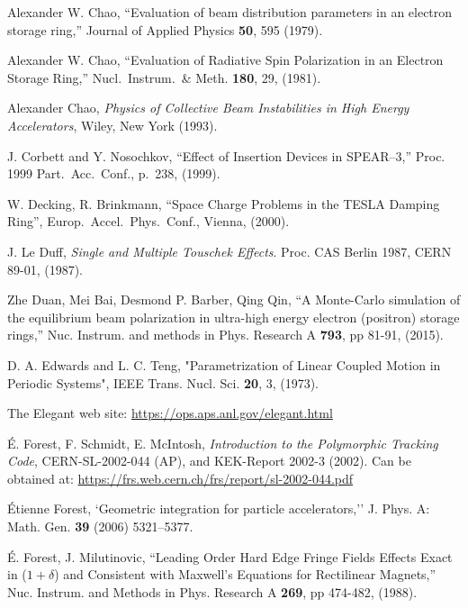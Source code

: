 \begin{thebibliography}{XXXXXXX99}
Alexander W. Chao, 
``Evaluation of beam distribution parameters in an electron storage ring,''
Journal of Applied Physics {\bf 50}, 595 (1979).

Alexander W. Chao, 
``Evaluation of Radiative Spin Polarization in an Electron Storage Ring,''
Nucl.\ Instrum.\ \& Meth. {\bf 180}, 29, (1981).

Alexander Chao, 
{\em Physics of Collective Beam Instabilities in High Energy Accelerators}, 
Wiley, New York (1993). 

J. Corbett and Y. Nosochkov, ``Effect of Insertion Devices in SPEAR--3,''
Proc. 1999 Part.\ Acc.\ Conf., p.~238, (1999).

W. Decking, R. Brinkmann, 
``Space Charge Problems in the TESLA Damping Ring'',
Europ.\ Accel.\ Phys.\ Conf., Vienna, (2000).

  J. Le Duff, \emph{Single and Multiple Touschek Effects}.
  Proc. CAS Berlin 1987,
  CERN 89-01, (1987).

Zhe Duan, Mei Bai, Desmond P. Barber, Qing Qin, 
``A Monte-Carlo simulation of the equilibrium beam polarization in ultra-high energy electron
(positron) storage rings,''
Nuc. Instrum. and methods in Phys. Research A {\bf 793}, pp 81-91, (2015).

D. A. Edwards and L. C. Teng, 
"Parametrization of Linear Coupled Motion in Periodic Systems",
IEEE Trans. Nucl. Sci. {\bf 20}, 3, (1973).

The Elegant web site:
\hfill\break
\hspace*{0.3in} \url{https://ops.aps.anl.gov/elegant.html}

\'E. Forest, F. Schmidt, E. McIntosh, 
{\it Introduction to the Polymorphic Tracking Code}, 
CERN-SL-2002-044 (AP), and KEK-Report 2002-3 (2002). 
Can be obtained at:
\hfill\break
\hspace*{0.3in}
\url{https://frs.web.cern.ch/frs/report/sl-2002-044.pdf}

\'Etienne Forest, `Geometric integration for particle accelerators,''
J. Phys. A: Math. Gen. {\bf 39} (2006) 5321–5377.

\'E. Forest, J. Milutinovic, 
``Leading Order Hard Edge Fringe Fields Effects Exact in ($1+\delta$) and 
Consistent with Maxwell's Equations for Rectilinear Magnets,''
Nuc. Instrum. and Methods in Phys. Research A {\bf 269}, pp 474-482, (1988).


\end{thebibliography}
